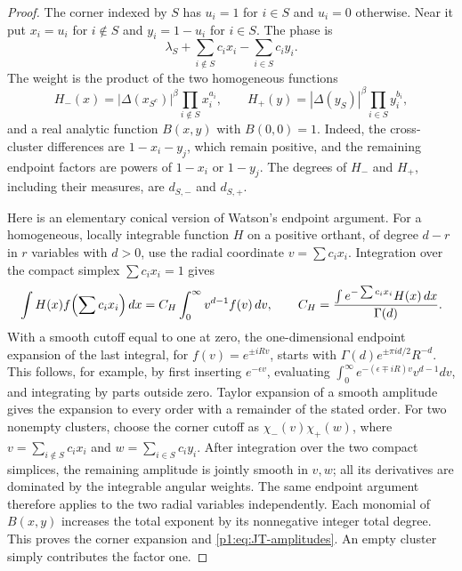 \documentclass[11pt,a4paper]{article}
\theoremstyle{definition}
\theoremstyle{remark}
\numberwithin{equation}{section}
\begin{document}
\begin{proof}
The corner indexed by $S$ has $u_i=1$ for $i\in S$ and $u_i=0$
otherwise.  Near it put $x_i=u_i$ for $i\notin S$ and $y_i=1-u_i$
for $i\in S$.  The phase is
\[
 \lambda_S+\sum_{i\notin S}c_i x_i-\sum_{i\in S}c_i y_i.
\]
The weight is the product of the two homogeneous functions
\[
 H_-(x)=|\Delta(x_{S^c})|^\beta\prod_{i\notin S}x_i^{a_i},
 \qquad
 H_+(y)=|\Delta(y_S)|^\beta\prod_{i\in S}y_i^{b_i},
\]
and a real analytic function $B(x,y)$ with $B(0,0)=1$.  Indeed, the
cross-cluster differences are $1-x_i-y_j$, which remain positive,
and the remaining endpoint factors are powers of $1-x_i$ or $1-y_j$.
The degrees of $H_-$ and $H_+$, including their measures, are
$d_{S,-}$ and $d_{S,+}$.

Here is an elementary conical version of Watson's endpoint argument.
For a homogeneous, locally integrable function $H$ on a positive
orthant, of degree $d-r$ in $r$ variables with $d>0$, use the radial
coordinate $v=\sum c_i x_i$.  Integration over the compact simplex
$\sum c_i x_i=1$ gives
\[
 \int H(x)f\Bigl(\sum c_i x_i\Bigr)\,dx
   =C_H\int_0^\infty v^{d-1}f(v)\,dv,
 \qquad C_H=\frac{\int e^{-\sum c_i x_i}H(x)\,dx}{\Gamma(d)}.
\]
With a smooth cutoff equal to one at zero, the one-dimensional
endpoint expansion of the last integral, for $f(v)=e^{\pm iRv}$,
starts with $\Gamma(d)e^{\pm\pi i d/2}R^{-d}$.
This follows, for example, by first inserting $e^{-\epsilon v}$,
evaluating $\int_0^\infty e^{-(\epsilon\mp iR)v}v^{d-1}dv$,
and integrating by parts outside zero.  Taylor expansion of a smooth
amplitude gives the expansion to every order with a remainder of
the stated order.  For two nonempty clusters, choose the corner cutoff as
$\chi_-(v)\chi_+(w)$, where $v=\sum_{i\notin S}c_ix_i$ and
$w=\sum_{i\in S}c_iy_i$.  After integration over the two compact
simplices, the remaining amplitude is jointly smooth in $v,w$;
all its derivatives are dominated by the integrable angular weights.
The same endpoint argument therefore applies to the two radial
variables independently.  Each monomial of $B(x,y)$ increases the
total exponent by its nonnegative integer total degree.  This proves
the corner expansion and \eqref{p1:eq:JT-amplitudes}.  An empty cluster
simply contributes the factor one.


\end{proof}
\end{document}
